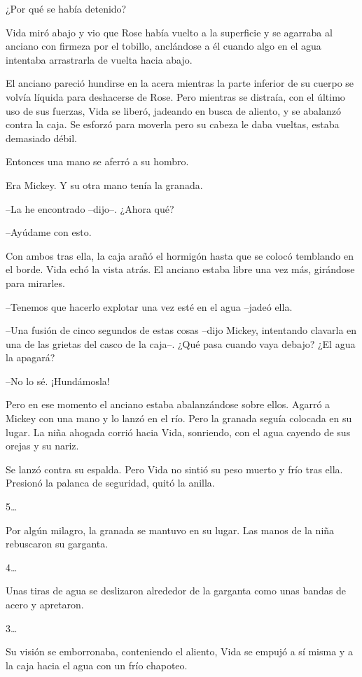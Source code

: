{¿Por qué se había detenido?}

{Vida miró abajo y vio que Rose había vuelto a la superficie y se
 agarraba al anciano con firmeza por el tobillo, anclándose a él cuando
algo en el agua intentaba arrastrarla de vuelta hacia abajo.}

{El anciano pareció hundirse en la acera mientras la parte inferior de
 su cuerpo se volvía líquida para deshacerse de Rose. Pero mientras se
 distraía, con el último uso de sus fuerzas, Vida se liberó, jadeando en
 busca de aliento, y se abalanzó contra la caja. Se esforzó para moverla
pero su cabeza le daba vueltas, estaba demasiado débil.}

{Entonces una mano se aferró a su hombro.}

{Era Mickey. Y su otra mano tenía la granada.}

{--La he encontrado --dijo--. ¿Ahora qué?}

{--Ayúdame con esto.}

{Con ambos tras ella, la caja arañó el hormigón hasta que se colocó
 temblando en el borde. Vida echó la vista atrás. El anciano estaba libre
una vez más, girándose para mirarles.}

{--Tenemos que hacerlo explotar una vez esté en el agua --jadeó ella.}

{--Una fusión de cinco segundos de estas cosas --dijo Mickey, intentando
 clavarla en una de las grietas del casco de la caja--. ¿Qué pasa cuando
vaya debajo? ¿El agua la apagará?}

{--No lo sé. ¡Hundámosla!}

{Pero en ese momento el anciano estaba abalanzándose sobre ellos. Agarró
 a Mickey con una mano y lo lanzó en el río. Pero la granada seguía
 colocada en su lugar. La niña ahogada corrió hacia Vida, sonriendo, con
el agua cayendo de sus orejas y su nariz.}

{Se lanzó contra su espalda. Pero Vida no sintió su peso muerto y frío
tras ella. Presionó la palanca de seguridad, quitó la anilla.}

{5\ldots{}}

{Por algún milagro, la granada se mantuvo en su lugar. Las manos de la
niña rebuscaron su garganta.}

{4\ldots{}}

{Unas tiras de agua se deslizaron alrededor de la garganta como unas
bandas de acero y apretaron.}

{3\ldots{}}

{Su visión se emborronaba, conteniendo el aliento, Vida se empujó a sí
misma y a la caja hacia el agua con un frío chapoteo.}

